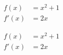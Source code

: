 \documentclass{article}
\begin{document}
\[\begin{aligned}
	f(x) & = x^{2} + 1 \\
	f\prime(x) & = 2x
\end{aligned}\]

\[\begin{aligned}
	f(x) & = x^{2} + 1 \\
	f\prime(x) & = 2x
\end{aligned}\]
\end{document}
